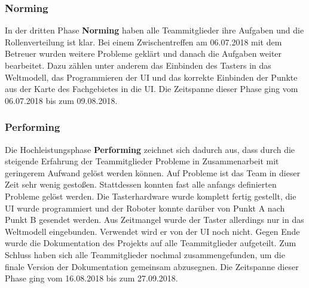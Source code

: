 \documentclass[a4paper,12pt,headsepline]{scrartcl}
\begin{document}
	\subsubsection{Norming}
		In der dritten Phase \textbf{Norming} haben alle Teammitglieder ihre Aufgaben und die Rollenverteilung ist klar. Bei einem Zwischentreffen am 06.07.2018 mit dem Betreuer wurden weitere Probleme geklärt und danach die Aufgaben weiter bearbeitet. Dazu zählen unter anderem das Einbinden des Tasters in das Weltmodell, das Programmieren der UI und das korrekte Einbinden der Punkte aus der Karte des Fachgebietes in die UI. Die Zeitspanne dieser Phase ging vom 06.07.2018 bis zum 09.08.2018.
	\subsubsection{Performing}
		Die Hochleistungsphase \textbf{Performing} zeichnet sich dadurch aus, dass durch die steigende Erfahrung der Teammitglieder Probleme in Zusammenarbeit mit geringerem Aufwand gelöst werden können. Auf Probleme ist das Team in dieser Zeit sehr wenig gestoßen. Stattdessen konnten fast alle anfangs definierten Probleme gelöst werden. Die Tasterhardware wurde komplett fertig gestellt, die UI wurde programmiert und der Roboter konnte darüber von Punkt A nach Punkt B gesendet werden. Aus Zeitmangel wurde der Taster allerdings nur in das Weltmodell eingebunden. Verwendet wird er von der UI noch nicht. Gegen Ende wurde die Dokumentation des Projekts auf alle Teammitglieder aufgeteilt. Zum Schluss haben sich alle Teammitglieder nochmal zusammengefunden, um die finale Version der Dokumentation gemeinsam abzusegnen. Die Zeitspanne dieser Phase ging vom 16.08.2018 bis zum 27.09.2018.
	\newpage
\end{document}
